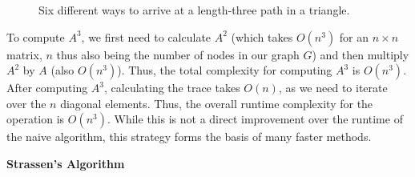 \documentclass[11pt]{article}
\newcommand{\subsubsubsection}[1]{
  \vspace{1em} %
  \noindent\textbf{#1} %
  \vspace{0.5em} %
}
\begin{document}
\begin{figure}[H]
\begin{subfigure}{0.15\textwidth}
    \end{subfigure}
    \begin{subfigure}{0.15\textwidth}
        \centering
    \end{subfigure}
    \begin{subfigure}{0.15\textwidth}
        \centering
    \end{subfigure}
    \caption{Six different ways to arrive at a length-three path in a triangle.}
    \label{fig:triangle-traversal}
\end{figure}

To compute $A^3$, we first need to calculate $A^2$ (which takes $O(n^3)$ for an $n \times n$ matrix, $n$ thus also being the number of nodes in our graph $G$) and then multiply $A^2$ by $A$ (also $O(n^3)$).
Thus, the total complexity for computing $A^3$ is $O(n^3)$.
After computing $A^3$, calculating the trace takes $O(n)$, as we need to iterate over the $n$ diagonal elements.
Thus, the overall runtime complexity for the operation is $O(n^3)$.
While this is not a direct improvement over the runtime of the naive algorithm, this strategy forms the basis of many faster methods.

\subsubsubsection{Strassen's Algorithm}
\end{document}
